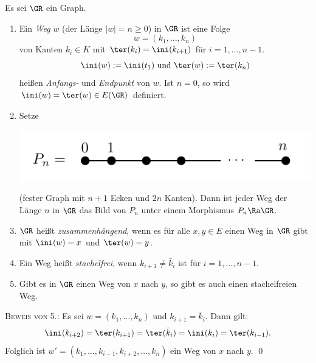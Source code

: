\DB Es sei $\GR$ ein Graph.
\begin{enumerate}
\item Ein \emph{Weg} $w$ (der Länge $|w|=n\geq 0$) in $\GR$
ist eine Folge
\[
w = (k_1,\ldots,k_n)
\]
von Kanten $k_i\in K$ mit $\ter(k_i)=\ini(k_{i+1})$ für
$i=1,\ldots,n-1$.
\[
\ini(w):=\ini(t_1) \text{ und } \ter(w):=\ter(k_n)
\]
heißen \emph{Anfangs-} und \emph{Endpunkt} von $w$.
Ist $n=0$, so wird $\ini(w)=\ter(w)\in E(\GR)$ definiert.
\item Setze
\begin{center}
	\includegraphics{grugraImages/Pn}
\end{center}
(fester Graph mit $n+1$ Ecken und $2n$ Kanten).
Dann ist jeder Weg der Länge $n$ in $\GR$ das Bild von $P_n$ unter
einem Morphismus $P_n\Ra \GR$.
\item $\GR$ heißt \emph{zusammenhängend},
wenn es für alle $x,y\in E$ einen Weg in $\GR$ gibt mit
$\ini(w)=x$ und $\ter(w)=y$.
\item Ein Weg heißt \emph{stachelfrei},
wenn $k_{i+1}\neq \bar{k}_i$ ist für $i=1,\ldots,n-1$.
\item Gibt es in $\GR$ einen Weg von $x$ nach $y$, so gibt es auch
einen stachelfreien Weg.
\end{enumerate}
\textsc{Beweis von 5.:} Es sei $w=(k_1,\ldots,k_n)$ und
$k_{i+1}=\bar{k}_i$. Dann gilt:
\[
\ini(k_{i+2}) = \ter(k_{i+1}) = \ter(\bar{k}_{i})
= \ini(k_i) = \ter(k_{i-1}).
\]
Folglich ist $w'=(k_1,\ldots,k_{i-1},k_{i+2},\ldots,k_n)$ ein
Weg von $x$ nach $y$.
\qed


